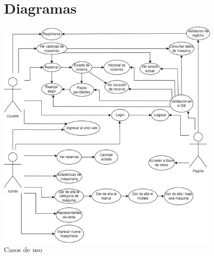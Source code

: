 \documentclass{article}
\begin{document}
\begin{figure}
\section{Diagramas}
    \centering
    \includegraphics[width=1.1\linewidth]{Casos.jpg}
    \caption{Casos de uso}
    \label{fig:enter-label}
\end{figure}
\end{document}
